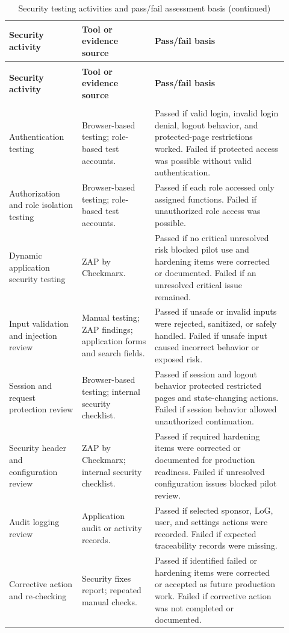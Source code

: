 \begin{longtable}{>{\raggedright\arraybackslash}p{0.24\linewidth}
>{\raggedright\arraybackslash}p{0.24\linewidth}
>{\raggedright\arraybackslash}p{0.44\linewidth}}
\caption{Security testing activities and pass/fail assessment basis}\label{table:security-testing-pass-fail}\\
\toprule
\textbf{Security activity} & \textbf{Tool or evidence source} & \textbf{Pass/fail basis} \\
\midrule
\endfirsthead
\caption[]{Security testing activities and pass/fail assessment basis (continued)}\\
\toprule
\textbf{Security activity} & \textbf{Tool or evidence source} & \textbf{Pass/fail basis} \\
\midrule
\endhead
\midrule
\multicolumn{3}{r}{\textit{Continued on next page}}\\
\endfoot
\bottomrule
\endlastfoot
Authentication testing & Browser-based testing; role-based test accounts. & Passed if valid login, invalid login denial, logout behavior, and protected-page restrictions worked. Failed if protected access was possible without valid authentication. \\
Authorization and role isolation testing & Browser-based testing; role-based test accounts. & Passed if each role accessed only assigned functions. Failed if unauthorized role access was possible. \\
Dynamic application security testing & ZAP by Checkmarx. & Passed if no critical unresolved risk blocked pilot use and hardening items were corrected or documented. Failed if an unresolved critical issue remained. \\
Input validation and injection review & Manual testing; ZAP findings; application forms and search fields. & Passed if unsafe or invalid inputs were rejected, sanitized, or safely handled. Failed if unsafe input caused incorrect behavior or exposed risk. \\
Session and request protection review & Browser-based testing; internal security checklist. & Passed if session and logout behavior protected restricted pages and state-changing actions. Failed if session behavior allowed unauthorized continuation. \\
Security header and configuration review & ZAP by Checkmarx; internal security checklist. & Passed if required hardening items were corrected or documented for production readiness. Failed if unresolved configuration issues blocked pilot review. \\
Audit logging review & Application audit or activity records. & Passed if selected sponsor, LoG, user, and settings actions were recorded. Failed if expected traceability records were missing. \\
Corrective action and re-checking & Security fixes report; repeated manual checks. & Passed if identified failed or hardening items were corrected or accepted as future production work. Failed if corrective action was not completed or documented. \\
\end{longtable}

